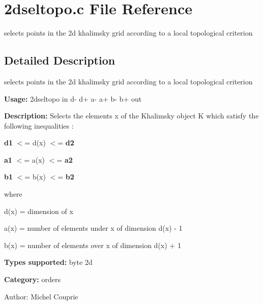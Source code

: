 \section{2dseltopo.c File Reference}
\label{2dseltopo_8c}
selects points in the 2d khalimsky grid according to a local topological criterion 



\subsection{Detailed Description}
selects points in the 2d khalimsky grid according to a local topological criterion 

{\bf Usage:} 2dseltopo in d- d+ a- a+ b- b+ out

{\bf Description:} Selects the elements x of the Khalimsky object K which satisfy the following inequalities :

{\bf d1} $<$= d(x) $<$= {\bf d2} 

{\bf a1} $<$= a(x) $<$= {\bf a2} 

{\bf b1} $<$= b(x) $<$= {\bf b2} 

where

d(x) = dimension of x

a(x) = number of elements under x of dimension d(x) - 1

b(x) = number of elements over x of dimension d(x) + 1

{\bf Types supported:} byte 2d

{\bf Category:} orders

\begin{Desc}
\item[Author:]Michel Couprie \end{Desc}
